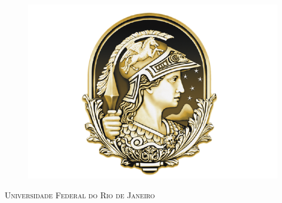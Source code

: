 \documentclass[
	12pt,				%
	openright,			%
	twoside,			%
	a4paper,			%
	chapter=TITLE,		%
	english,			%
	french,				%
	spanish,			%
	brazil				%
	]{abntex2}
\begin{document}


\frenchspacing 


\begin{figure}
	\centering
	\includegraphics[scale=0.35]{capitulos/fig/minerva}
	\label{minerva}
\end{figure}

\textsc{\Large Universidade Federal do Rio de Janeiro} %


\imprimircapa

\imprimirfolhaderosto*


%
%     
\end{document}

